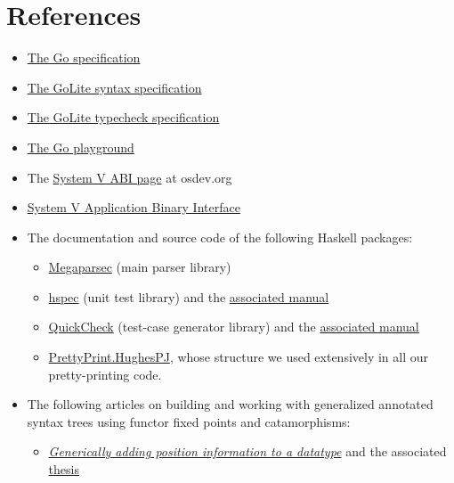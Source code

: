\documentclass[letterpaper,11pt]{article}
\begin{document}
\section{References}

\begin{itemize}
\item \href{https://golang.org/ref/spec}{The Go specification}
\item \href{http://www.sable.mcgill.ca/~hendren/520/2016/assignments/syntax.pdf}{The GoLite syntax specification}
\item \href {http://www.sable.mcgill.ca/~hendren/520/2016/assignments/typechecker.pdf}{The GoLite typecheck specification}
\item \href{https://play.golang.org/}{The Go playground}
\item The \href{http://wiki.osdev.org/System_V_ABI}{System V ABI page} at osdev.org
\item \href{http://www.x86-64.org/documentation/abi.pdf}{System V Application Binary Interface}
\item The documentation and source code of the following Haskell packages:
	\begin{itemize}
	\item \href{https://hackage.haskell.org/package/megaparsec-4.3.0}{Megaparsec} (main parser library)
	\item \href{https://hackage.haskell.org/package/hspec}{hspec} (unit test library) and the \href{http://hspec.github.io/}{associated manual}
	\item \href{https://hackage.haskell.org/package/QuickCheck-2.8.2}{QuickCheck} (test-case generator library) and the \href{http://www.cse.chalmers.se/~rjmh/QuickCheck/manual.html}{associated manual}
	\item \href{http://hackage.haskell.org/package/pretty-1.1.2.0/docs/Text-PrettyPrint-HughesPJ.html}{PrettyPrint.HughesPJ}, whose structure we used extensively in all our pretty-printing code.
	\end{itemize}
\item The following articles on building and working with generalized annotated syntax trees using functor fixed points and catamorphisms:
	\begin{itemize}
	\item \href{http://martijn.van.steenbergen.nl/journal/2010/06/24/generically-adding-position-information-to-a-datatype/}{\textit{Generically adding position information to a datatype}} and the associated \href{http://martijn.van.steenbergen.nl/projects/Selections.pdf}{thesis}

\end{itemize}
\end{itemize}
\end{document}
